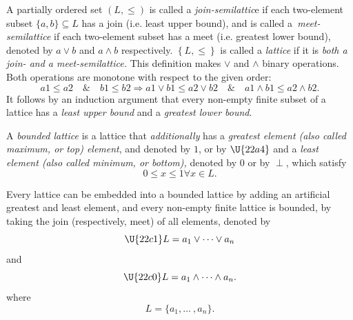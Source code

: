\documentclass{conm-p-l}
\theoremstyle{definition}
\theoremstyle{remark}
\numberwithin{equation}{section}
\theoremstyle{plain}
\begin{document}
A partially ordered set $(L,\leq )$ is called a \emph{join-semilattic}e if
each two-element subset $\{a,b\}\subseteq L$ has a join (i.e. least upper
bound), and is called a\emph{\ meet-semilattice} if each two-element subset
has a meet (i.e. greatest lower bound), denoted by $a\vee b$ and $a\wedge b$
respectively. $\left\{ L,\leq \right\} $ is called a \emph{lattice} if it is 
\emph{both a join- and a meet-semilattice.} This definition makes $\vee $
and $\wedge $ binary operations. Both operations are monotone with respect
to the given order:%
\begin{equation}
a1\leq a2\quad \&\quad b1\leq b2\Rightarrow a1\vee b1\leq a2\vee b2\quad
\&\quad a1\wedge b1\leq a2\wedge b2.
\end{equation}
It follows by an induction argument that every non-empty finite subset of a
lattice has a \emph{least upper bound} and a \emph{greatest lower bound}. 

A \emph{bounded lattice} is a lattice that \emph{additionally} has a \emph{%
greatest element (also called maximum, or top) element}, and denoted by $1$,
or by $\U{22a4} $  and a \emph{least element (also called minimum, or
bottom),} denoted by $0$ or by $\perp $, which satisfy%
\begin{equation}
0\leq x\leq 1\forall x\in L.
\end{equation}

Every lattice can be embedded into a bounded lattice by adding an artificial
greatest and least element, and every non-empty finite lattice is bounded,
by taking the join (respectively, meet) of all elements, denoted by%
\begin{equation}
\U{22c1} L=a_{1}\vee \cdots \vee a_{n}
\end{equation}%
and 
\begin{equation}
\U{22c0} L=a_{1}\wedge \cdots \wedge a_{n}.
\end{equation}
where%
\begin{equation}
L=\{a_{1},\ldots \ ,a_{n}\}.
\end{equation}
\end{document}
